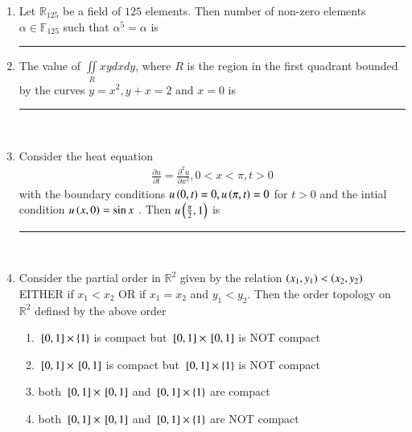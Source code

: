 \documentclass[journal,12pt,onecolumn]{IEEEtran}
\theoremstyle{remark}
\begin{document}
\begin{enumerate}
       \item Let $\mathbb{R}_{125}$ be a field of $125$ elements. Then number of non-zero elements $\alpha \in \mathbb{F}_{125}$ such that $\alpha^5 = \alpha$ is \rule{3cm}{0.15mm}
       \item The value of $\iint \limits_R x y dx dy$, where $R$ is the region in the first quadrant bounded  by the curves $y = x^2 , y+x=2 \text{ and } x =0$ is \rule{3cm}{0.15mm}\\
       \item Consider the heat equation 
       \begin{align}
           \frac{\partial u}{\partial t} = \frac{\partial ^2 u}{\partial x^2} , 0<x<\pi , t>0
       \end{align}
       with the boundary conditions $u\left(0,t\right) = 0 , u\left(\pi , t\right) = 0$ for $t>0$ and the intial condition $u\left(x,0\right) = \sin{x}$ . Then $u\left(\frac{\pi}{2},1\right)$ is \rule{3cm}{0.15mm}\\
       \item Consider the partial order in $\mathbb{R}^2$ given by the relation $\left(x_1,y_1\right) < \left(x_2,y_2\right)$ EITHER if $x_1 < x_2$ OR if $x_1 = x_2$ and $y_1 < y_2$. Then the order topology on $\mathbb{R}^2$ defined by the above order
       \begin{enumerate}
           \item ${}\left[0,1\right] \times \left\{1\right\}$ is compact but ${}\left[0,1\right] \times {}\left[0,1\right]$ is NOT compact
           \item ${}\left[0,1\right] \times {}\left[0,1\right]$ is compact but ${}\left[0,1\right] \times \left\{1\right\}$ is NOT compact
           \item both ${}\left[0,1\right] \times {}\left[0,1\right]$ and ${}\left[0,1\right] \times \left\{1\right\}$ are compact
           \item both ${}\left[0,1\right] \times {}\left[0,1\right]$ and ${}\left[0,1\right] \times \left\{1\right\}$ are NOT  compact
       \end{enumerate}
   \end{enumerate}
\end{document}
